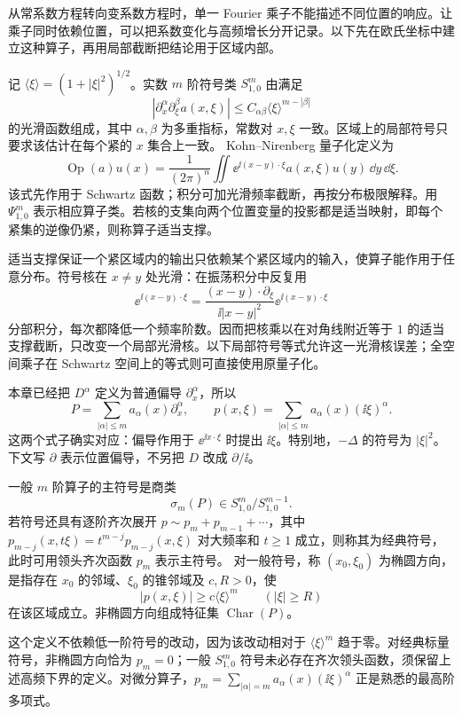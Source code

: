 从常系数方程转向变系数方程时，单一 Fourier 乘子不能描述不同位置的响应。让乘子同时依赖位置，可以把系数变化与高频增长分开记录。以下先在欧氏坐标中建立这种算子，再用局部截断把结论用于区域内部。

\begin{definition}[符号与伪微分算子]
记 $\langle\xi\rangle=(1+|\xi|^2)^{1/2}$。实数 $m$ 阶符号类 $S^m_{1,0}$ 由满足
\[
|\partial_x^\alpha\partial_\xi^\beta a(x,\xi)|
\le C_{\alpha\beta}\langle\xi\rangle^{m-|\beta|}
\]
的光滑函数组成，其中 $\alpha,\beta$ 为多重指标，常数对 $x,\xi$ 一致。区域上的局部符号只要求该估计在每个紧的 $x$ 集合上一致。
Kohn--Nirenberg 量子化定义为
\[
\operatorname{Op}(a)u(x)
=\frac1{(2\pi)^n}\iint
\ee^{\ii(x-y)\cdot\xi}a(x,\xi)u(y)\,\dd y\,\dd\xi.
\]
该式先作用于 Schwartz 函数；积分可加光滑频率截断，再按分布极限解释。用 $\Psi^m_{1,0}$ 表示相应算子类。若核的支集向两个位置变量的投影都是适当映射，即每个紧集的逆像仍紧，则称算子适当支撑。
\end{definition}

适当支撑保证一个紧区域内的输出只依赖某个紧区域内的输入，使算子能作用于任意分布。符号核在 $x\ne y$ 处光滑：在振荡积分中反复用
\[
\ee^{\ii(x-y)\cdot\xi}
=\frac{(x-y)\cdot\partial_\xi}{\ii|x-y|^2}
\ee^{\ii(x-y)\cdot\xi}
\]
分部积分，每次都降低一个频率阶数。因而把核乘以在对角线附近等于 $1$ 的适当支撑截断，只改变一个局部光滑核。以下局部符号等式允许这一光滑核误差；全空间乘子在 Schwartz 空间上的等式则可直接使用原量子化。

本章已经把 $D^\alpha$ 定义为普通偏导 $\partial_x^\alpha$，所以
\[
P=\sum_{|\alpha|\le m}a_\alpha(x)\partial_x^\alpha,
\qquad p(x,\xi)=\sum_{|\alpha|\le m}a_\alpha(x)(\ii\xi)^\alpha.
\]
这两个式子确实对应：偏导作用于 $\ee^{\ii x\cdot\xi}$ 时提出 $\ii\xi$。特别地，$-\Delta$ 的符号为 $|\xi|^2$。下文写 $\partial$ 表示位置偏导，不另把 $D$ 改成 $\partial/\ii$。

\begin{definition}[主符号与椭圆方向]
一般 $m$ 阶算子的主符号是商类
\[
\sigma_m(P)\in S^m_{1,0}/S^{m-1}_{1,0}.
\]
若符号还具有逐阶齐次展开 $p\sim p_m+p_{m-1}+\cdots$，其中 $p_{m-j}(x,t\xi)=t^{m-j}p_{m-j}(x,\xi)$ 对大频率和 $t\ge1$ 成立，则称其为经典符号，此时可用领头齐次函数 $p_m$ 表示主符号。
对一般符号，称 $(x_0,\xi_0)$ 为椭圆方向，是指存在 $x_0$ 的邻域、$\xi_0$ 的锥邻域及 $c,R>0$，使
\[
|p(x,\xi)|\ge c\langle\xi\rangle^m\qquad(|\xi|\ge R)
\]
在该区域成立。非椭圆方向组成特征集 $\operatorname{Char}(P)$。
\end{definition}

这个定义不依赖低一阶符号的改动，因为该改动相对于 $\langle\xi\rangle^m$ 趋于零。对经典标量符号，非椭圆方向恰为 $p_m=0$；一般 $S^m_{1,0}$ 符号未必存在齐次领头函数，须保留上述高频下界的定义。对微分算子，$p_m=\sum_{|\alpha|=m}a_\alpha(x)(\ii\xi)^\alpha$ 正是熟悉的最高阶多项式。

